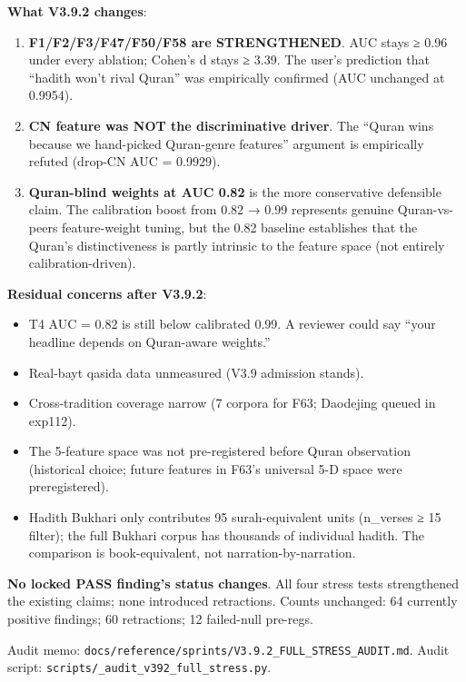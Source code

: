 \documentclass[
]{article}
\newcounter{none} %
\providecommand{\tightlist}{%
  \setlength{\itemsep}{0pt}\setlength{\parskip}{0pt}}
\begin{document}
\textbf{What V3.9.2 changes}:

\begin{enumerate}
\def\labelenumi{\arabic{enumi}.}
\item
  \textbf{F1/F2/F3/F47/F50/F58 are STRENGTHENED}. AUC stays ≥ 0.96 under
  every ablation; Cohen's d stays ≥ 3.39. The user's prediction that
  ``hadith won't rival Quran'' was empirically confirmed (AUC unchanged
  at 0.9954).
\item
  \textbf{CN feature was NOT the discriminative driver}. The ``Quran
  wins because we hand-picked Quran-genre features'' argument is
  empirically refuted (drop-CN AUC = 0.9929).
\item
  \textbf{Quran-blind weights at AUC 0.82} is the more conservative
  defensible claim. The calibration boost from 0.82 → 0.99 represents
  genuine Quran-vs-peers feature-weight tuning, but the 0.82 baseline
  establishes that the Quran's distinctiveness is partly intrinsic to
  the feature space (not entirely calibration-driven).
\end{enumerate}

\textbf{Residual concerns after V3.9.2}:

\begin{itemize}
\tightlist
\item
  T4 AUC = 0.82 is still below calibrated 0.99. A reviewer could say
  ``your headline depends on Quran-aware weights.''
\item
  Real-bayt qasida data unmeasured (V3.9 admission stands).
\item
  Cross-tradition coverage narrow (7 corpora for F63; Daodejing queued
  in exp112).
\item
  The 5-feature space was not pre-registered before Quran observation
  (historical choice; future features in F63's universal 5-D space were
  preregistered).
\item
  Hadith Bukhari only contributes 95 surah-equivalent units (n\_verses ≥
  15 filter); the full Bukhari corpus has thousands of individual
  hadith. The comparison is book-equivalent, not narration-by-narration.
\end{itemize}

\textbf{No locked PASS finding's status changes}. All four stress tests
strengthened the existing claims; none introduced retractions. Counts
unchanged: 64 currently positive findings; 60 retractions; 12
failed-null pre-regs.

Audit memo:
\texttt{docs/reference/sprints/V3.9.2\_FULL\_STRESS\_AUDIT.md}. Audit
script: \texttt{scripts/\_audit\_v392\_full\_stress.py}.
\end{document}
